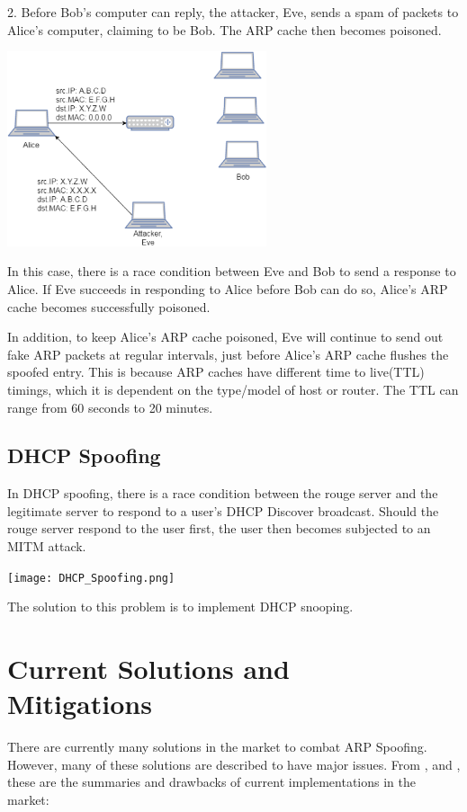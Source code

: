 \documentclass{acm_proc_article-sp}
\begin{document}
2. Before Bob's computer can reply, the attacker, Eve, sends a spam of packets to Alice's computer, claiming to be Bob. The ARP cache then becomes poisoned. 

\includegraphics[width=3in]{Poisoned_ARP.eps}

In this case, there is a race condition between Eve and Bob to send a response to Alice. If Eve succeeds in responding to Alice before Bob can do so, Alice's ARP cache becomes successfully poisoned. 

In addition, to keep Alice's ARP cache poisoned, Eve will continue to send out fake ARP packets at regular intervals, just before Alice's ARP cache flushes the spoofed entry. This is because ARP caches have different time to live(TTL) timings, which it is dependent on the type/model of host or router. The TTL can range from 60 seconds to 20 minutes. 

\subsection{DHCP Spoofing}
In DHCP spoofing, there is a race condition between the rouge server and the legitimate server to respond to a user's DHCP Discover broadcast. 
Should the rouge server respond to the user first, the user then becomes subjected to an MITM attack. 

\texttt{[image: DHCP\_Spoofing.png]}

The solution to this problem is to implement DHCP snooping. 

\section{Current Solutions and \\Mitigations}
There are currently many solutions in the market to combat ARP Spoofing. However, many of these solutions are described to have major issues. From \cite{vivek:arp}, \cite{navid:arp2} and \cite{goldendeep:arp3},  these are the summaries and drawbacks of current implementations in the market:
\end{document}
